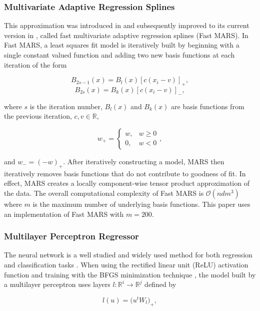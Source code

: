 \documentclass{scspaperproc}
\theoremstyle{scsthe}
\begin{document}
\vspace{-10pt}
\subsubsection{Multivariate Adaptive Regression Splines}
\vspace{-10pt}
This approximation was introduced in
 and subsequently improved to its
current version in , called fast
multivariate adaptive regression splines (Fast MARS). In Fast MARS, a
least squares fit model is iteratively built by beginning with a
single constant valued function and adding two new basis functions at
each iteration of the form

$$ B_{2s-1}(x) = B_l(x) [c(x_i-v)]_+ ,$$
$$ B_{2s}(x) = B_k(x) [c(x_i-v)]_- ,$$

where $s$ is the iteration number, $B_l(x)$ and $B_k(x)$ are basis
functions from the previous iteration, $c, v \in \mathbb{R}$, 

$$w_+ = \begin{cases} w, & w \geq 0 \\ 0, & w < 0 \end{cases},$$

and $w_- = (-w)_+$. After iteratively constructing a model, MARS then
iteratively removes basis functions that do not contribute to goodness
of fit. In effect, MARS creates a locally component-wise tensor
product approximation of the data. The overall computational
complexity of Fast MARS is $\mathcal{O}(n d m^3)$ where $m$ is the
maximum number of underlying basis functions. This paper uses an
implementation of Fast MARS  with $m =
200$.

\vspace{-10pt}
\subsubsection{Multilayer Perceptron Regressor}
\vspace{-10pt}
The neural network is a well studied and widely used method for both
regression and classification tasks
. When using the rectified linear unit
(ReLU) activation function  and training
with the BFGS minimization technique , the
model built by a multilayer perceptron uses layers $l : \mathbb{R}^{i}
\rightarrow \mathbb{R}^{j}$ defined by

$$ l(u) = \big( u^t W_l \big)_+ ,$$
\end{document}
